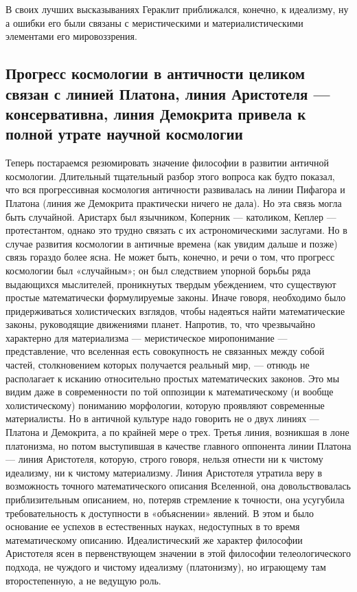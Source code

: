 В своих лучших высказываниях Гераклит приближался, конечно, к
идеализму, ну а ошибки его были связаны с меристическими и
материалистическими элементами его мировоззрения.

\subsection{Прогресс космологии в античности целиком связан с линией
Платона, линия Аристотеля --- консервативна, линия Демокрита привела к
полной утрате научной космологии}

Теперь постараемся резюмировать значение философии в развитии
античной космологии. Длительный тщательный разбор этого вопроса как
будто показал, что вся прогрессивная космология античности развивалась
на линии Пифагора и Платона (линия же Демокрита практически ничего не
дала). Но эта связь могла быть случайной. Аристарх был язычником,
Коперник --- католиком, Кеплер --- протестантом, однако это трудно
связать с их астрономическими заслугами. Но в случае развития
космологии в античные времена (как увидим дальше и позже) связь
гораздо более ясна. Не может быть, конечно, и речи о том, что
прогресс космологии был «случайным»; он был следствием упорной борьбы
ряда выдающихся мыслителей, проникнутых твердым убеждением, что
существуют простые математически формулируемые законы. Иначе говоря,
необходимо было придерживаться холистических взглядов, чтобы надеяться
найти математические законы, руководящие движениями планет. Напротив,
то, что чрезвычайно характерно для материализма --- меристическое
миропонимание --- представление, что вселенная есть совокупность не
связанных между собой частей, столкновением которых получается
реальный мир, --- отнюдь не располагает к исканию относительно простых
математических законов. Это мы видим даже в современности по той
оппозиции к математическому (и вообще холистическому) пониманию
морфологии, которую проявляют современные материалисты. Но в античной
культуре надо говорить не о двух линиях --- Платона и Демокрита, а по
крайней мере о трех. Третья линия, возникшая в лоне платонизма, но
потом выступившая в качестве главного оппонента линии Платона ---
линия Аристотеля, которую, строго говоря, нельзя отнести ни к чистому
идеализму, ни к чистому материализму. Линия Аристотеля утратила веру в
возможность точного математического описания Вселенной, она
довольствовалась приблизительным описанием, но, потеряв стремление к
точности, она усугубила требовательность к доступности в «объяснении»
явлений. В этом и было основание ее успехов в естественных науках,
недоступных в то время математическому описанию. Идеалистический же
характер философии Аристотеля ясен в первенствующем значении в этой
философии телеологического подхода, не чуждого и чистому идеализму
(платонизму), но играющему там второстепенную, а не ведущую роль.

